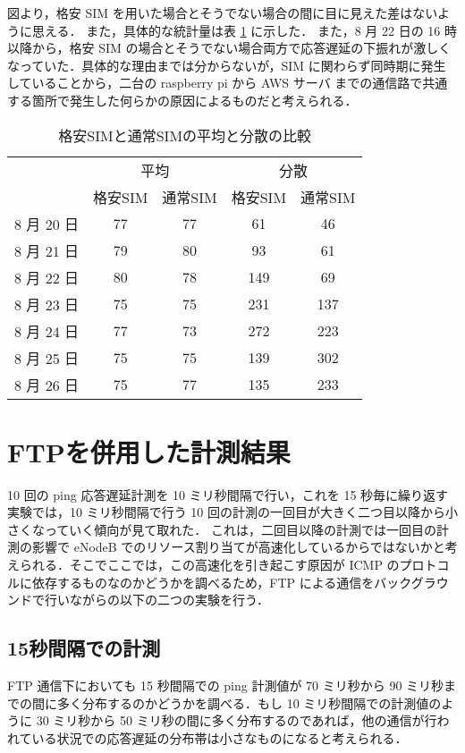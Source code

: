 \documentclass[a4j]{jarticle}
\begin{document}
図より，格安 SIM を用いた場合とそうでない場合の間に目に見えた差はないように思える．
また，具体的な統計量は表 \ref{sim} に示した．
また，8 月 22 日の 16 時以降から，格安 SIM の場合とそうでない場合両方で応答遅延の下振れが激しくなっていた．具体的な理由までは分からないが，SIM に関わらず同時期に発生していることから，二台の raspberry pi から AWS サーバ までの通信路で共通する箇所で発生した何らかの原因によるものだと考えられる．
\begin{table}[tb]
\begin{center}
\caption{格安SIMと通常SIMの平均と分散の比較}
\label{sim}
\begin{tabular}{|c|c|c|c|c|}
\hline
&\multicolumn{2}{|c|}{平均} &\multicolumn{2}{|c|}{分散}\\
&格安SIM&通常SIM&格安SIM&通常SIM\\
\hline
8 月 20 日&77&77&61&46\\
\hline
8 月 21 日&79&80&93&61\\
\hline
8 月 22 日&80&78&149&69\\
\hline
8 月 23 日&75&75&231&137\\
\hline
8 月 24 日&77&73&272&223\\
\hline
8 月 25 日&75&75&139&302\\
\hline
8 月 26 日&75&77&135&233\\
\hline
\end{tabular}
\end{center}
\end{table}
\section{FTPを併用した計測結果}
10 回の ping 応答遅延計測を 10 ミリ秒間隔で行い，これを 15 秒毎に繰り返す実験では，10 ミリ秒間隔で行う 10 回の計測の一回目が大きく二つ目以降から小さくなっていく傾向が見て取れた．
これは，二回目以降の計測では一回目の計測の影響で eNodeB でのリソース割り当てが高速化しているからではないかと考えられる．そこでここでは，この高速化を引き起こす原因が ICMP のプロトコルに依存するものなのかどうかを調べるため，FTP による通信をバックグラウンドで行いながらの以下の二つの実験を行う．

\subsection{15秒間隔での計測}
FTP 通信下においても 15 秒間隔での ping 計測値が 70 ミリ秒から 90 ミリ秒までの間に多く分布するのかどうかを調べる．もし 10 ミリ秒間隔での計測値のように 30 ミリ秒から 50 ミリ秒の間に多く分布するのであれば，他の通信が行われている状況での応答遅延の分布帯は小さなものになると考えられる．
\end{document}
